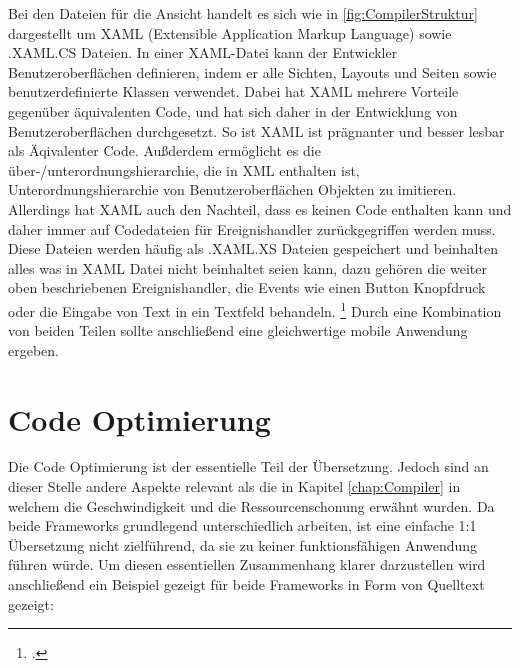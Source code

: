 Bei den Dateien für die Ansicht handelt es sich wie in \ref{fig:CompilerStruktur} dargestellt um XAML (Extensible Application Markup Language) sowie .XAML.CS Dateien.  In einer XAML-Datei kann der Entwickler Benutzeroberflächen definieren, indem er alle Sichten, Layouts und Seiten sowie benutzerdefinierte Klassen verwendet.  Dabei hat XAML mehrere Vorteile gegenüber äquivalenten Code,  und hat sich daher in der Entwicklung von Benutzeroberflächen durchgesetzt.  So ist XAML ist prägnanter und besser lesbar als Äqivalenter Code.  Außderdem ermöglicht es die über-/unterordnungshierarchie, die in XML enthalten ist,  Unterordnungshierarchie von Benutzeroberflächen Objekten zu imitieren.  Allerdings hat XAML auch den Nachteil, dass es keinen Code enthalten kann und daher immer auf Codedateien für Ereignishandler zurückgegriffen werden muss.  Diese Dateien werden häufig als .XAML.XS Dateien gespeichert und beinhalten alles was in XAML Datei nicht beinhaltet seien kann,  dazu gehören die weiter oben beschriebenen Ereignishandler,  die Events wie einen Button Knopfdruck oder die Eingabe von Text in ein Textfeld behandeln. \footcite[Vgl.][Abgerufen am \today]{MicrosoftXAML2017}
Durch eine Kombination von beiden Teilen sollte anschließend eine gleichwertige mobile Anwendung ergeben. 

\section{Code Optimierung}
Die Code Optimierung ist der essentielle Teil der Übersetzung.  Jedoch sind an dieser Stelle andere Aspekte relevant als die in Kapitel \ref{chap:Compiler} in welchem die Geschwindigkeit und die Ressourcenschonung erwähnt wurden.  Da beide Frameworks grundlegend unterschiedlich arbeiten,  ist eine einfache 1:1 Übersetzung nicht zielführend,  da sie zu keiner funktionsfähigen Anwendung führen würde.  Um diesen essentiellen Zusammenhang klarer darzustellen wird anschließend ein Beispiel gezeigt für beide Frameworks in Form von Quelltext gezeigt: 


\begin{minipage}{\linewidth}

\end{minipage}


